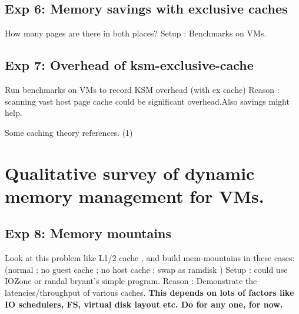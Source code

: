 \documentclass[11pt]{article}
\begin{document}
\subsection{Exp 6: Memory savings with exclusive caches}
\label{sec-5_1}

How many pages are there in both places?
Setup : Benchmarks on VMs.
\subsection{Exp 7: Overhead of ksm-exclusive-cache}
\label{sec-5_2}

Run benchmarks on VMs to record KSM overhead (with ex cache)
Reason : scanning vast host page cache could be significant overhead.Also savings might help.

Some caching theory references.
   (1)
\section{Qualitative survey of dynamic memory management for VMs.}
\label{sec-6}
\subsection{Exp 8: Memory mountains}
\label{sec-6_1}

Look at this problem like L1/2 cache , and build mem-mountains in these cases:
(normal ; no guest cache ; no host cache ; swap as ramdisk )
Setup : could use IOZone or randal bryant's simple program.
Reason : Demonstrate the latencies/throughput of various caches. 
\textbf{This depends on lots of factors like IO schedulers, FS, virtual disk layout etc. Do for any one, for now.}
\end{document}
